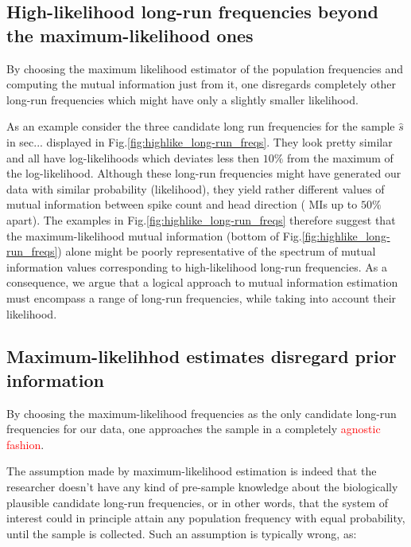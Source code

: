 \subsection*{High-likelihood long-run frequencies beyond the maximum-likelihood ones}
By choosing the maximum likelihood estimator of the population frequencies and computing the mutual information just from it, one disregards completely other long-run frequencies which might have only a slightly smaller likelihood. 

As an example consider the three candidate long run frequencies for the sample $\hat{s}$ in sec... displayed in Fig.\ref{fig:highlike_long-run_freqs}. They look pretty similar and all have log-likelihoods which deviates less then $10\%$ from the maximum of the log-likelihood. Although these long-run frequencies might have generated our data with similar probability (likelihood), they yield rather different values of mutual information between spike count and head direction ( MIs up to $50\%$ apart). The examples in Fig.\ref{fig:highlike_long-run_freqs} therefore suggest that the maximum-likelihood mutual information (bottom of Fig.\ref{fig:highlike_long-run_freqs}) alone  might be poorly representative of the spectrum of mutual information values corresponding to high-likelihood long-run frequencies. As a consequence, we argue that a logical approach to mutual information estimation must encompass a range of long-run frequencies, while taking into account their likelihood. 


\subsection*{Maximum-likelihhod estimates disregard prior information} 

By choosing the maximum-likelihood frequencies as the only candidate long-run frequencies for our data, one approaches the sample in a completely \textcolor{red}{agnostic fashion}.



The assumption made by maximum-likelihood estimation is indeed that the researcher doesn't have any kind of pre-sample knowledge about the biologically plausible candidate long-run frequencies, or in other words, that the system of interest could in principle attain any population frequency with equal probability, until the sample is collected. 
Such an assumption is typically wrong, as:

